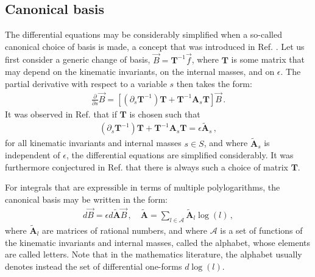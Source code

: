\documentclass{article}
\begin{document}
\subsection{Canonical basis}
\label{sec:canonicalbases}
The differential equations may be considerably simplified when a so-called canonical choice of basis is made, a concept that was introduced in Ref. \cite{Henn:2013pwa}. Let us first consider a generic change of basis, $\vec{B} = \mathbf{T}^{-1} \vec{f}$, where $\mathbf{T}$ is some matrix that may depend on the kinematic invariants, on the internal masses, and on $\epsilon$. The partial derivative with respect to a variable $s$ then takes the form:
\begin{align}
    \label{eq:canformpartials1}
    \frac{\partial}{\partial s}\vec{B} = \left[\left(\partial_{s}\mathbf{T}^{-1}\right)\mathbf{T}+\mathbf{T}^{-1}\mathbf{A}_{s}\mathbf{T}\right] \vec{B}\,.
\end{align}
It was observed in Ref. \cite{Henn:2013pwa} that if $\mathbf{T}$ is chosen such that
\begin{align}
    \label{eq:changeofbasiscan}
    \left(\partial_{s}\mathbf{T}^{-1}\right)\mathbf{T}+\mathbf{T}^{-1}\mathbf{A}_{s}\mathbf{T} = \epsilon \tilde{\mathbf{A}}_s\,, 
\end{align}
for all kinematic invariants and internal masses $s \in S$, and where $\tilde{\mathbf{A}}_s$ is independent of $\epsilon$, the differential equations are simplified considerably. It was furthermore conjectured in Ref. \cite{Henn:2013pwa} that there is always such a choice of matrix $\mathbf{T}$.

For integrals that are expressible in terms of multiple polylogarithms, the canonical basis may be written in the form:
\begin{align}
    \label{eq:canformpoly}
    d \vec{B} = \epsilon d\tilde{\mathbf{\mathbf{A}}} \vec{B}\,,\quad \tilde{\mathbf{A}} = \sum_{l \in \mathcal{A}} \tilde{\mathbf{A}}_l \log(l) \,,
\end{align}
where $\tilde{\mathbf{A}}_l$ are matrices of rational numbers, and where $\mathcal{A}$ is a set of functions of the kinematic invariants and internal masses, called the alphabet, whose elements are called letters. Note that in the mathematics literature, the alphabet usually denotes instead the set of differential one-forms $d\log(l)$.
\end{document}
